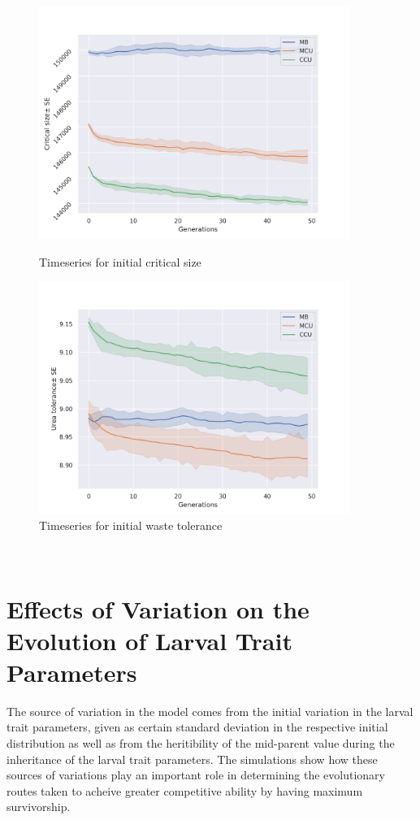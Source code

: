 \begin{figure}[h]
  \centering
  \includegraphics[width=0.9\textwidth]{C4/Figs/mc}
  \caption{Timeseries for initial critical size}
  \label{mc}
  \includegraphics[width=0.9\textwidth]{C4/Figs/wtol}
  \caption{Timeseries for initial waste tolerance}
  \label{wtol}
\end{figure}\\

\newpage
\section{Effects of Variation on the Evolution of Larval Trait Parameters}
The source of variation in the model comes from the initial variation in the larval trait parameters, given as certain standard deviation in the respective initial distribution as well as from the heritibility of the mid-parent value during the inheritance of the larval trait parameters. The simulations show how these sources of variations play an important role in determining the evolutionary routes taken to acheive greater competitive ability by having maximum survivorship.
